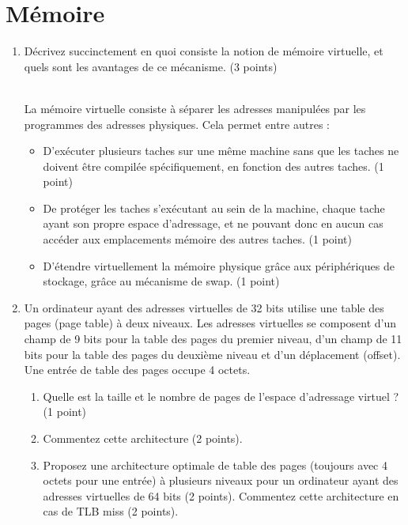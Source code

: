 \section{{Mémoire}
         {\hfill{} }}

\begin{enumerate}

\item Décrivez succinctement en quoi consiste la notion de mémoire virtuelle, et quels sont les avantages de ce mécanisme. (3 points)

\begin{correction}\\
La mémoire virtuelle consiste à séparer les adresses manipulées par les programmes des adresses physiques. Cela permet entre autres :
\begin{itemize}
  \item D'exécuter plusieurs taches  sur une même machine sans que les taches ne doivent être compilée spécifiquement, en fonction des autres taches. (1 point)
  \item De protéger les taches s'exécutant au sein de la machine, chaque tache ayant son propre espace d'adressage, et ne pouvant donc en aucun cas accéder aux emplacements mémoire des autres taches. (1 point)
  \item D'étendre virtuellement la mémoire physique grâce aux périphériques de stockage, grâce au mécanisme de swap. (1 point)
\end{itemize}
\end{correction}


\item Un ordinateur ayant des adresses virtuelles de 32 bits utilise une table des pages (page table) à deux niveaux. Les adresses virtuelles se composent d'un champ de 9 bits pour la table des pages du premier niveau, d'un champ de 11 bits pour la table des pages du deuxième niveau et d'un déplacement (offset). Une entrée de table des pages occupe 4 octets.
  \begin{enumerate}
  \item Quelle est la taille et le nombre de pages de l'espace d'adressage virtuel ? (1 point)
  \item Commentez cette architecture (2 points).
  \item Proposez une architecture optimale de table des pages (toujours avec 4 octets pour une entrée) à plusieurs niveaux pour un ordinateur ayant des adresses virtuelles de 64 bits (2 points). Commentez cette architecture en cas de TLB miss (2 points).
  \end{enumerate}


\end{enumerate}
